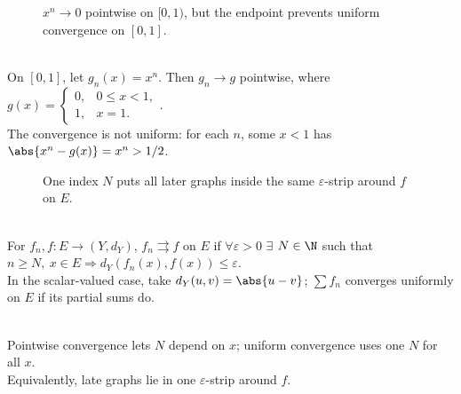 \begin{figure}[H]
  \centering
  
  \caption{$x^n\to0$ pointwise on $[0,1)$, but the endpoint prevents uniform convergence on $[0,1]$.}
  \label{fig:xn-pointwise-not-uniform}
\end{figure}

\begin{example} \label{ex:xn-pointwise-not-uniform} \\
On $[0,1]$, let $g_n(x)=x^n$. Then $g_n\to g$ pointwise, where
$g(x)=
\begin{cases}
0, & 0\leq x<1,\\
1, & x=1.
\end{cases}$.\\
The convergence is not uniform: for each $n$, some $x<1$ has $\abs{x^n-g(x)}=x^n>1/2$.
\end{example}

\begin{figure}[H]
  \centering
  
  \caption{One index $N$ puts all later graphs inside the same $\varepsilon$-strip around $f$ on $E$.}
  \label{fig:uniform-convergence-epsilon-strip}
\end{figure}

\begin{definition} \label{def:uniform-convergence-functions} \\
For $f_n,f:E\to(Y,d_Y)$, $f_n\rightrightarrows f$ on $E$ if $\forall \varepsilon>0$ $\exists$ $N \in \N$ such that $n\geq N,\ x\in E \Longrightarrow d_Y(f_n(x),f(x))\leq\varepsilon$.\\
In the scalar-valued case, take $d_Y(u,v)=\abs{u-v}$; $\sum f_n$ converges uniformly on $E$ if its partial sums do.
\end{definition}

\begin{perspective} \label{per:uniform-convergence-epsilon-strip} \\
Pointwise convergence lets $N$ depend on $x$; uniform convergence uses one $N$ for all $x$.\\
Equivalently, late graphs lie in one $\varepsilon$-strip around $f$.
\end{perspective}

